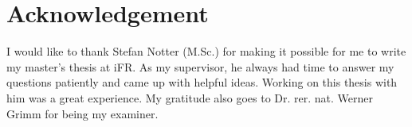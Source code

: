 \chapter*{Acknowledgement}
I would like to thank Stefan Notter (M.Sc.) for making it possible for me to write my master's thesis at iFR. As my supervisor, he always had time to answer my questions patiently and came up with helpful ideas. Working on this thesis with him was a great experience. My gratitude also goes to Dr. rer. nat. Werner Grimm for being my examiner.